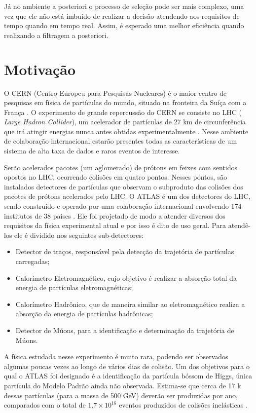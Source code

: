 Já no ambiente a posteriori o processo de seleção pode ser mais
complexo, uma vez que ele não está imbuído de realizar a decisão atendendo aos
requisitos de tempo quando em tempo real. Assim, é esperado 
uma melhor eficiência quando realizando a filtragem a posteriori.

\section{Motivação} 

O CERN (Centro Europeu para Pesquisas Nucleares) é o maior centro de
pesquisas em física de partículas do mundo, situado na fronteira da Suíça com a
França \cite{webCERN}. O experimento de grande repercussão do CERN se consiste no LHC ({\it
Large Hadron Collider}), um acelerador de partículas de 27 km de
circunferência que irá atingir energias nunca antes obtidas
experimentalmente \cite{webLHC}. 
Nesse ambiente de colaboração internacional estarão presentes
todas as características de um sistema de alta taxa de dados e raros eventos de
interesse.

Serão acelerados pacotes (um aglomerado) de prótons em feixes com sentidos opostos no LHC,
ocorrendo colisões em quatro pontos. Nesses pontos, são instalados 
detectores de partículas que observam o subproduto das colisões dos pacotes de prótons 
acelerados pelo LHC. O ATLAS é um dos detectores do LHC, sendo construído e operado por 
uma colaboração internacional envolvendo 174 institutos de 38
países \cite{webATLAS}. Ele foi projetado 
de modo a atender diversos dos requisitos da física experimental atual e por isso é dito de uso
geral. Para atendê-los ele é dividido nos seguintes sub-detectores:

\begin{itemize}
\item Detector de traços, responsável pela detecção da trajetória de partículas carregadas;
\item Calorímetro Eletromagnético, cujo objetivo é realizar a absorção total da
energia de partículas eletromagnéticas;
\item Calorímetro Hadrônico, que de maneira similar ao eletromagnético realiza a
absorção da energia de partículas hadrônicas;
\item Detector de Múons, para a identificação e determinação da trajetória de
Múons.
\end{itemize}

A física estudada nesse experimento é muito rara, podendo ser observados algumas
poucas vezes ao longo de vários dias de colisão. Um dos objetivos para o qual o
ATLAS foi designado é a identificação da partícula bóssom de Higgs, única partícula 
do Modelo Padrão ainda não observada. Estima-se que cerca de 17 k dessas
partículas (para a massa de 500 GeV) deverão ser produzidas por ano, comparados
com o total de $1.7\times10^{16}$ eventos produzidos de colisões inelásticas \cite{resumo_ATLAS}. 

